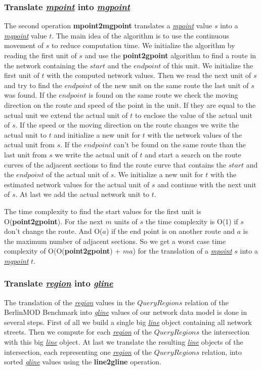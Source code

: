 \documentclass[a4paper]{article}
\newcommand{\bmodb} {BerlinMOD Benchmark}
\newcommand{\op}[1]{\textbf{#1}}
\newcommand{\dt}[1]{\textsl{\underline{#1}}}
\begin{document}
{\subsubsection{Translate \dt{mpoint} into \dt{mgpoint}}
The second operation \op{mpoint2mgpoint} translates a \dt{mpoint} value $s$
into a \dt{mgpoint} value $t$. The main idea of the algorithm is to use the
continuous movement of $s$ to reduce computation time. We initialize the
algorithm by reading the first unit of $s$ and use the \op{point2gpoint}
algorithm to find a route in the network containing the $start$ and
the $end point$ of this unit. We initialize the first unit of $t$ with
the computed network values. Then we read the next unit of $s$ and try to find
the $end point$ of the new unit on the same route the last unit of $s$ was
found. If the $end point$ is found on the same route we check the moving direction
on the route and speed of the point in the unit. If they are equal to the actual unit we extend
the actual unit of $t$ to enclose the value of the actual unit of $s$. If the
speed or the moving direction on the route changes we write the actual unit to $t$ and initialize
a new unit for $t$ with the network values of the actual unit from $s$.
If the $end point$ can't be found on the same route than the last unit from
$s$ we write the actual unit of $t$ and start a search on the route curves
of the adjacent sections to find the route curve that contains the $start$
and the $end point$ of the actual unit of $s$. We initialize a new unit
for $t$ with the estimated network values for the actual unit of $s$ and
continue with the next unit of $s$. At last we add the actual network unit
to $t$.

The time complexity to find the start values for the first unit is O(\op{point2gpoint}).
For the next $m$ units of $s$ the time complexity is O(1) if $s$ don't change the
route. And O($a$) if the end point is on another route and $a$ is the maximum
number of adjacent sections. So we get a worst case time complexity of
O(O(\op{point2gpoint}) + $ma$) for the translation of a \dt{mpoint} $s$ into a
\dt{mgpoint} $t$.
\subsubsection{Translate \dt{region} into \dt{gline}}
The translation of the \dt{region} values in the $QueryRegions$ relation of the
\bmodb{} into \dt{gline} values of our network data model is done in several steps.
First of all we build a single big \dt{line} object containing all network streets.
Then we compute for each \dt{region} of the $QueryRegions$ the intersection with
this big \dt{line} object. At last we translate the resulting \dt{line} objects
of the intersection, each representing one \dt{region} of the $QueryRegions$
relation, into sorted \dt{gline} values using the \op{line2gline} operation.

}
\end{document}

